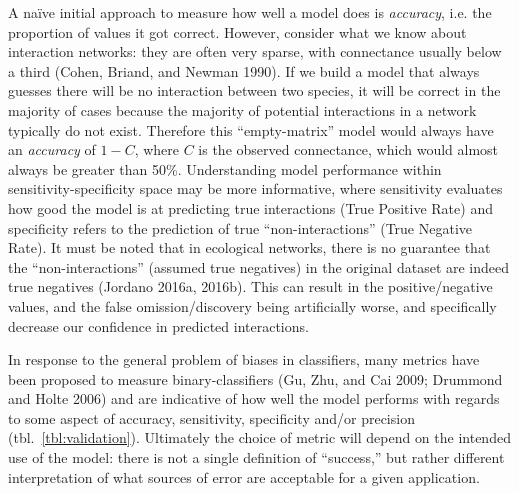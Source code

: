 \documentclass[10pt,oneside]{article}
\begin{document}
A naïve initial approach to measure how well a model does is
\emph{accuracy}, i.e. the proportion of values it got correct. However,
consider what we know about interaction networks: they are often very
sparse, with connectance usually below a third (Cohen, Briand, and
Newman 1990). If we build a model that always guesses there will be no
interaction between two species, it will be correct in the majority of
cases because the majority of potential interactions in a network
typically do not exist. Therefore this ``empty-matrix'' model would
always have an \emph{accuracy} of \(1-C\), where \(C\) is the observed
connectance, which would almost always be greater than 50\%.
Understanding model performance within sensitivity-specificity space may
be more informative, where sensitivity evaluates how good the model is
at predicting true interactions (True Positive Rate) and specificity
refers to the prediction of true ``non-interactions'' (True Negative
Rate). It must be noted that in ecological networks, there is no
guarantee that the ``non-interactions'' (assumed true negatives) in the
original dataset are indeed true negatives (Jordano 2016a, 2016b). This
can result in the positive/negative values, and the false
omission/discovery being artificially worse, and specifically decrease
our confidence in predicted interactions.

In response to the general problem of biases in classifiers, many
metrics have been proposed to measure binary-classifiers (Gu, Zhu, and
Cai 2009; Drummond and Holte 2006) and are indicative of how well the
model performs with regards to some aspect of accuracy, sensitivity,
specificity and/or precision (tbl.~\ref{tbl:validation}). Ultimately the
choice of metric will depend on the intended use of the model: there is
not a single definition of ``success,'' but rather different
interpretation of what sources of error are acceptable for a given
application.
\end{document}
